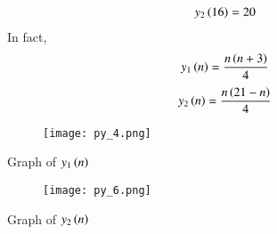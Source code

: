 \documentclass[beamer]{IEEEtran}
\theoremstyle{remark}
\begin{document}
\begin{align}
y_2\left(16\right)&=20
\end{align}
In fact,
\begin{align}
y_1\left(n\right)&=\frac{n\left(n+3\right)}{4}
\end{align}
\begin{align}
y_2\left(n\right)&=\frac{n\left(21-n\right)}{4}
\end{align}
\begin{figure}[h]
    \centering
    \texttt{[image: py\_4.png]}
    \label{fig:s1n}
\end{figure}
\begin{center}
    Graph of $y_1\left(n\right)$\\[30ex]
\end{center}
\begin{figure}[h]
    \centering
    \texttt{[image: py\_6.png]}
    \label{s2n}
\end{figure}
\begin{center}
Graph of $y_2\left(n\right)$
\end{center}
\end{document}
